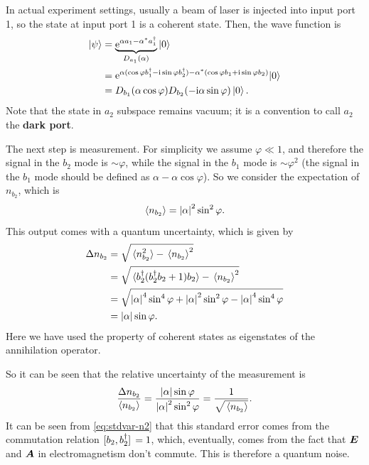 \documentclass[hyperref, a4paper]{article}
\newcommand*{\ii}{\mathrm{i}}
\newcommand*{\ee}{\mathrm{e}}
\newcommand*{\concept}[1]{{\textbf{#1}}}
\begin{document}
In actual experiment settings,
usually a beam of laser is injected into input port 1,
so the state at input port 1 is a coherent state.
Then, the wave function is 
\begin{equation}
    \begin{aligned}
        \ket{\psi} &= \underbrace{\ee^{\alpha a_1 - \alpha^* a_1^\dagger}}_{D_{a_1}(\alpha)} \ket{0} \\
        &= \ee^{\alpha (\cos \varphi b_1^\dagger - \ii \sin \varphi b_2^\dagger) -\alpha^{*} (\cos \varphi b_1 + \ii \sin \varphi b_2)}|0\rangle \\
        &= D_{b_1} (\alpha \cos \varphi) D_{b_2} (- \ii \alpha \sin \varphi) \ket{0} .
    \end{aligned}
    \label{eq:out-state}
\end{equation}
Note that the state in $a_2$ subspace remains vacuum;
it is a convention to call $a_2$ the \concept{dark port}.

The next step is measurement.
For simplicity we assume $\varphi \ll 1$,
and therefore the signal in the $b_2$ mode is $\sim \varphi$,
while the signal in the $b_1$ mode is $\sim \varphi^2$
(the signal in the $b_1$ mode should be defined as $\alpha - \alpha \cos \varphi$).
So we consider the expectation of $n_{b_2}$, which is
\begin{equation}
    \expval{n_{b_2}} = \abs{\alpha}^2 \sin^2 \varphi.
    \label{eq:output-exp}
\end{equation}
This output comes with a quantum uncertainty, which is given by 
\begin{equation}
    \begin{aligned}
        \Delta n_{b_2} &= \sqrt{ \expval*{n_{b_2}^2} - \expval*{n_{b_2}}^2 } \\
        &= \sqrt{ \expval*{ b_2^\dagger (b_2^\dagger b_2 + 1) b_2} - \expval*{n_{b_2}}^2 } \\
        &= \sqrt{ \abs{\alpha}^4 \sin^4 \varphi + \abs{\alpha}^2 \sin^2 \varphi - \abs{\alpha}^4 \sin^4 \varphi } \\
        &= \abs{\alpha} \sin \varphi.
    \end{aligned}
    \label{eq:stdvar-n2}
\end{equation}
Here we have used the property of coherent states as eigenstates of the annihilation operator.

So it can be seen that the relative uncertainty of the measurement is 
\begin{equation}
    \frac{\Delta n_{b_2}}{\expval{n_{b_2}}} 
    = \frac{\abs{\alpha} \sin \varphi}{\abs{\alpha}^2 \sin^2 \varphi} = \frac{1}{\sqrt{\expval*{n_{b_2}}}}.
    \label{eq:relvar-n2}
\end{equation}
It can be seen from \eqref{eq:stdvar-n2} that this standard error comes from 
the commutation relation $\comm*{b_2}{b_2^\dagger} = 1$,
which, eventually, comes from the fact that $\vb*{E}$ and $\vb*{A}$ in electromagnetism don't commute.
This is therefore a quantum noise.
\end{document}
